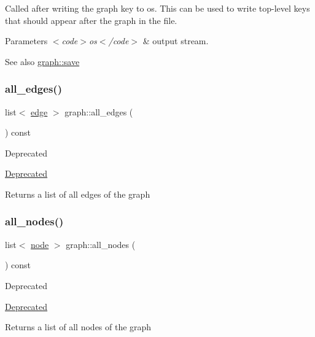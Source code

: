 Called after writing the graph key to {\ttfamily os}. This can be used to write top-\/level keys that should appear after the graph in the file.


\begin{DoxyParams}{Parameters}
{\em $<$code$>$os$<$/code$>$} & output stream. \\
\hline
\end{DoxyParams}
\begin{DoxySeeAlso}{See also}
\mbox{\hyperlink{classgraph_a7bd0712a528249d1585085a64ac3e661}{graph\+::save}} 
\end{DoxySeeAlso}
\mbox{\label{classgraph_a8d2de5158a430ba21a85871a9657104b}} 
\subsubsection{\texorpdfstring{all\+\_\+edges()}{all\_edges()}}
{\footnotesize\ttfamily list$<$ \mbox{\hyperlink{classedge}{edge}} $>$ graph\+::all\+\_\+edges (\begin{DoxyParamCaption}{ }\end{DoxyParamCaption}) const}

\begin{DoxyRefDesc}{Deprecated}
\item[\mbox{\hyperlink{deprecated__deprecated000004}{Deprecated}}]\end{DoxyRefDesc}
\begin{DoxyReturn}{Returns}
a list of all edges of the graph 
\end{DoxyReturn}
\mbox{\label{classgraph_a13155130debfd891efcd132702016bde}} 
\subsubsection{\texorpdfstring{all\+\_\+nodes()}{all\_nodes()}}
{\footnotesize\ttfamily list$<$ \mbox{\hyperlink{classnode}{node}} $>$ graph\+::all\+\_\+nodes (\begin{DoxyParamCaption}{ }\end{DoxyParamCaption}) const}

\begin{DoxyRefDesc}{Deprecated}
\item[\mbox{\hyperlink{deprecated__deprecated000003}{Deprecated}}]\end{DoxyRefDesc}
\begin{DoxyReturn}{Returns}
a list of all nodes of the graph 
\end{DoxyReturn}
\mbox{\label{classgraph_a351617e023b4b6833ab650a70fc086e7}} 
